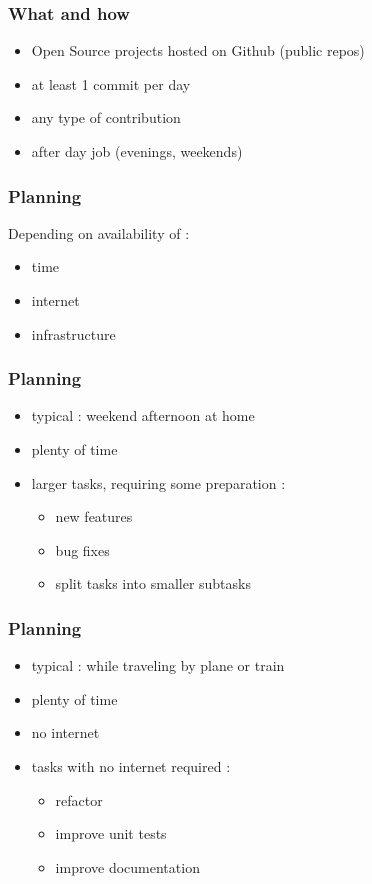 \documentclass[14pt]{beamer}
\begin{document}
  \begin{frame}
    \frametitle{What and how}
    \begin{itemize}
      \item Open Source projects hosted on Github (public repos)
      \item at least 1 commit per day
      \item any type of contribution
      \item after day job (evenings, weekends)
    \end{itemize}
  \end{frame}
  \begin{frame}
    \frametitle{Planning}
    Depending on availability of :
    \begin{itemize}
      \item time
      \item internet
      \item infrastructure
    \end{itemize}
  \end{frame}
  \begin{frame}
    \frametitle{Planning}
    \begin{itemize}
      \item typical : weekend afternoon at home
      \item plenty of time
      \item larger tasks, requiring some preparation :
      \begin{itemize}
        \item new features
        \item bug fixes
        \item split tasks into smaller subtasks
      \end{itemize}
    \end{itemize}
  \end{frame}
  \begin{frame}
    \frametitle{Planning}
    \begin{itemize}
      \item typical : while traveling by plane or train
      \item plenty of time
      \item no internet
      \item tasks with no internet required :
      \begin{itemize}
        \item refactor
        \item improve unit tests
        \item improve documentation
      \end{itemize}
    \end{itemize}
  \end{frame}
\end{document}
